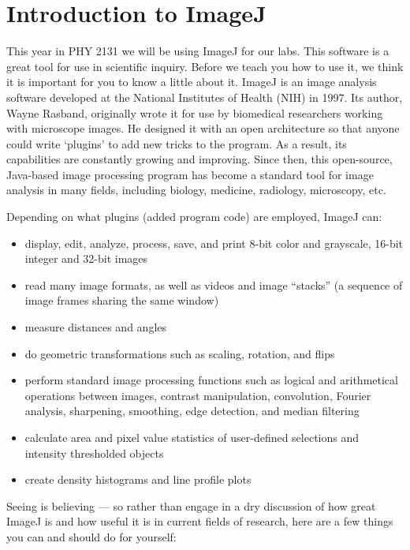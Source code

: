 \chapter{Introduction to ImageJ}
\thispagestyle{fancy}
This year in PHY 2131 we will be using ImageJ for our labs. 
This software is a great tool for use in scientific inquiry. 
Before we teach you how to use it, we think it is important for you to know a little about it. 
ImageJ is an image analysis software developed at the National Institutes of Health (NIH) in 1997. 
Its author, Wayne Rasband, originally wrote it for use by biomedical researchers working with microscope images. 
He designed it with an open architecture so that anyone could write `plugins' to add new tricks to the program. 
As a result, its capabilities are constantly growing and improving. 
Since then, this open-source, Java-based image processing program has become a standard tool for image analysis in many fields, including biology, medicine, radiology, microscopy, etc.
\par 
Depending on what plugins (added program code) are employed, ImageJ can:
\begin{itemize}
\item display, edit, analyze, process, save, and print 8-bit color and grayscale, 16-bit integer and 32-bit images
\item read many image formats, as well as videos and image ``stacks'' (a sequence of image frames sharing the same window)
\item measure distances and angles
\item do geometric transformations such as scaling, rotation, and flips
\item perform standard image processing functions such as logical and arithmetical operations between images, contrast manipulation, convolution, Fourier analysis, sharpening, smoothing, edge detection, and median filtering
\item calculate area and pixel value statistics of user-defined selections and intensity thresholded objects
\item create density histograms and line profile plots
\end{itemize}
Seeing is believing — so rather than engage in a dry discussion of how great ImageJ is and how useful it is in current fields of research, here are a few things you can and should do for yourself:
